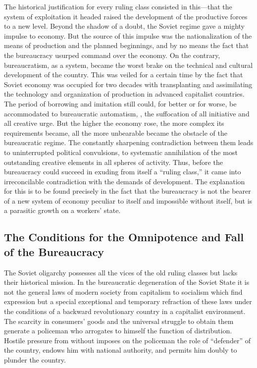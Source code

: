 The historical justification for every ruling class consisted in this---that the system of exploitation it headed raised the development of the productive forces to a new level. Beyond the shadow of a doubt, the Soviet regime gave a mighty impulse to economy. But the source of this impulse was the nationalization of the means of production and the planned beginnings, and by no means the fact that the bureaucracy usurped command over the economy. On the contrary, bureaucratism, as a system, became the worst brake on the technical and cultural development of the country. This was veiled for a certain time by the fact that Soviet economy was occupied for two decades with transplanting and assimilating the technology and organization of production in advanced capitalist countries. The period of borrowing and imitation still could, for better or for worse, be accommodated to bureaucratic automatism, \ie, the suffocation of all initiative and all creative urge. But the higher the economy rose, the more complex its requirements became, all the more unbearable became the obstacle of the bureaucratic regime. The constantly sharpening contradiction between them leads to uninterrupted political convulsions, to systematic annihilation of the most outstanding creative elements in all spheres of activity. Thus, before the bureaucracy could succeed in exuding from itself a “ruling class,” it came into irreconcilable contradiction with the demands of development. The explanation for this is to be found precisely in the fact that the bureaucracy is not the bearer of a new system of economy peculiar to itself and impossible without itself, but is a parasitic growth on a workers’ state.
\nowidow

\subsection*{The Conditions for the Omnipotence and Fall of the Bureaucracy}

The Soviet oligarchy possesses all the vices of the old ruling classes but lacks their historical mission. In the bureaucratic degeneration of the Soviet State it is not the general laws of modern society from capitalism to socialism which find expression but a special exceptional and temporary refraction of these laws under the conditions of a backward revolutionary country in a capitalist environment. The scarcity in consumers’ goods and the universal struggle to obtain them generate a policeman who arrogates to himself the function of distribution. Hostile pressure from without imposes on the policeman the role of “defender” of the country, endows him with national authority, and permits him doubly to plunder the country.

